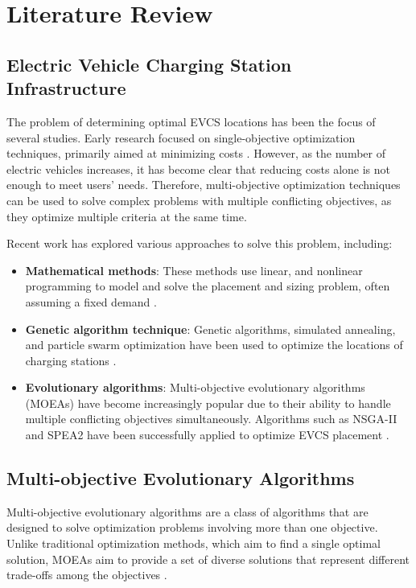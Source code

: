 \documentclass[12pt]{report}
\begin{document}
\chapter{Literature Review}

\section{Electric Vehicle Charging Station Infrastructure}
The problem of determining optimal EVCS locations has been the focus of several studies. Early research focused on single-objective optimization techniques, primarily aimed at minimizing costs \cite{ref1}. However, as the number of electric vehicles increases, it has become clear that reducing costs alone is not enough to meet users' needs. Therefore, multi-objective optimization techniques can be used to solve complex problems with multiple conflicting objectives, as they optimize multiple criteria at the same time.

Recent work has explored various approaches to solve this problem, including:
\begin{itemize}
    \item \textbf{Mathematical methods}: These methods use linear, and nonlinear programming to model and solve the placement and sizing problem, often assuming a fixed demand \cite{ref2}.
    \item \textbf{Genetic algorithm technique}: Genetic algorithms, simulated annealing, and particle swarm optimization have been used to optimize the locations of charging stations \cite{ref3}.
    \item \textbf{Evolutionary algorithms}: Multi-objective evolutionary algorithms (MOEAs) have become increasingly popular due to their ability to handle multiple conflicting objectives simultaneously. Algorithms such as NSGA-II and SPEA2 have been successfully applied to optimize EVCS placement \cite{ref4}.
\end{itemize}

\section{Multi-objective Evolutionary Algorithms}
Multi-objective evolutionary algorithms are a class of algorithms that are designed to solve optimization problems involving more than one objective. Unlike traditional optimization methods, which aim to find a single optimal solution, MOEAs aim to provide a set of diverse solutions that represent different trade-offs among the objectives \cite{ref5}.
\end{document}
